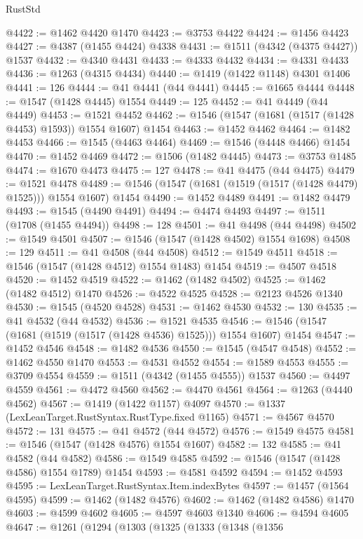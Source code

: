\begin{lexlean}{RustStd}
\begin{coremodule}
{\begin{coremodule}
{{{{{{{{{{{{{{{{{{{{{{{{{{{{{{@4422 := @1462 @4420 @1470
@4423 := @3753 @4422
@4424 := @1456 @4423
@4427 := @4387 (@1455 @4424) @4338
@4431 := @1511 (@4342 (@4375 @4427)) @1537
@4432 := @4340 @4431
@4433 := @4333 @4432
@4434 := @4331 @4433
@4436 := @1263 (@4315 @4434)
@4440 := @1419 (@1422 @1148) @4301 @1406
@4441 := 126
@4444 := @41 @4441 (@44 @4441)
@4445 := @1665 @4444
@4448 := @1547 (@1428 @4445) @1554
@4449 := 125
@4452 := @41 @4449 (@44 @4449)
@4453 := @1521 @4452
@4462 := @1546 (@1547 (@1681 (@1517 (@1428 @4453) @1593)) @1554 @1607) @1454
@4463 := @1452 @4462
@4464 := @1482 @4453
@4466 := @1545 (@4463 @4464)
@4469 := @1546 (@4448 @4466) @1454
@4470 := @1452 @4469
@4472 := @1506 (@1482 @4445)
@4473 := @3753 @1485
@4474 := @1670 @4473
@4475 := 127
@4478 := @41 @4475 (@44 @4475)
@4479 := @1521 @4478
@4489 := @1546 (@1547 (@1681 (@1519 (@1517 (@1428 @4479) @1525))) @1554 @1607) @1454
@4490 := @1452 @4489
@4491 := @1482 @4479
@4493 := @1545 (@4490 @4491)
@4494 := @4474 @4493
@4497 := @1511 (@1708 (@1455 @4494))
@4498 := 128
@4501 := @41 @4498 (@44 @4498)
@4502 := @1549 @4501
@4507 := @1546 (@1547 (@1428 @4502) @1554 @1698)
@4508 := 129
@4511 := @41 @4508 (@44 @4508)
@4512 := @1549 @4511
@4518 := @1546 (@1547 (@1428 @4512) @1554 @1483) @1454
@4519 := @4507 @4518
@4520 := @1452 @4519
@4522 := @1462 (@1482 @4502)
@4525 := @1462 (@1482 @4512) @1470
@4526 := @4522 @4525
@4528 := @2123 @4526 @1340
@4530 := @1545 (@4520 @4528)
@4531 := @1462 @4530
@4532 := 130
@4535 := @41 @4532 (@44 @4532)
@4536 := @1521 @4535
@4546 := @1546 (@1547 (@1681 (@1519 (@1517 (@1428 @4536) @1525))) @1554 @1607) @1454
@4547 := @1452 @4546
@4548 := @1482 @4536
@4550 := @1545 (@4547 @4548)
@4552 := @1462 @4550 @1470
@4553 := @4531 @4552
@4554 := @1589 @4553
@4555 := @3709 @4554
@4559 := @1511 (@4342 (@1455 @4555)) @1537
@4560 := @4497 @4559
@4561 := @4472 @4560
@4562 := @4470 @4561
@4564 := @1263 (@4440 @4562)
@4567 := @1419 (@1422 @1157) @4097
@4570 := @1337 (LexLeanTarget.RustSyntax.RustType.fixed @1165)
@4571 := @4567 @4570
@4572 := 131
@4575 := @41 @4572 (@44 @4572)
@4576 := @1549 @4575
@4581 := @1546 (@1547 (@1428 @4576) @1554 @1607)
@4582 := 132
@4585 := @41 @4582 (@44 @4582)
@4586 := @1549 @4585
@4592 := @1546 (@1547 (@1428 @4586) @1554 @1789) @1454
@4593 := @4581 @4592
@4594 := @1452 @4593
@4595 := LexLeanTarget.RustSyntax.Item.indexBytes
@4597 := @1457 (@1564 @4595)
@4599 := @1462 (@1482 @4576)
@4602 := @1462 (@1482 @4586) @1470
@4603 := @4599 @4602
@4605 := @4597 @4603 @1340
@4606 := @4594 @4605
@4647 := @1261
    (@1294
      (@1303
        (@1325
          (@1333
            (@1348
              (@1356
}}}}}}}}}}}}}}}}}}}}}}}}}}}}}}
\end{coremodule}}
\end{coremodule}
\end{lexlean}
